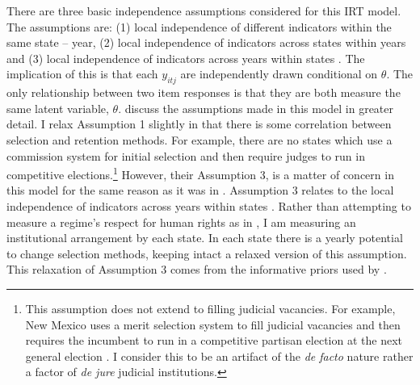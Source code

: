 \documentclass[12pt]{article}
\begin{document}
There are three basic independence assumptions considered for this IRT model.  The assumptions are: (1) local independence of different indicators within the same state -- year, (2) local independence of indicators across states within years and (3) local independence of indicators across years within states \citep[8]{Schnakenberg2014}.  The implication of this is that each $y_{itj}$ are independently drawn conditional on $\theta$.  The only relationship between two item responses is that they are both measure the same latent variable, $\theta$. \citet[8]{Schnakenberg2014} discuss the assumptions made in this model in greater detail.  I relax Assumption 1 slightly in that there is some correlation between selection and retention methods. For example, there are no states which use a commission system for initial selection and then require judges to run in competitive elections.\footnote{This assumption does not extend to filling judicial vacancies.  For example, New Mexico uses a merit selection system to fill judicial vacancies and then requires the incumbent to run in a competitive partisan election at the next general election \citep{AJS}.  I consider this to be an artifact of the \textit{de facto} nature rather a factor of \textit{de jure} judicial institutions.}  However, their Assumption 3, is a matter of concern in this model for the same reason as it was in \citet{Schnakenberg2014}.  Assumption 3 relates to the local independence of indicators across years within states \citep[8]{Schnakenberg2014}.  Rather than attempting to measure a regime's respect for human rights as in \citet{Schnakenberg2014}, I am measuring an institutional arrangement by each state.  In each state there is a yearly potential to change selection methods, keeping intact a relaxed version of this assumption.  This relaxation of Assumption 3 comes from the informative priors used by \citet[8]{Schnakenberg2014}.    
\end{document}
